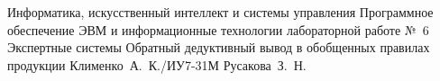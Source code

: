 \documentclass{bmstu}
\begin{document}
\makereporttitle
    {Информатика, искусственный интеллект и системы управления} %
    {Программное обеспечение ЭВМ и информационные технологии} %
    {лабораторной работе №~6} %
    {Экспертные системы} %
    {Обратный дедуктивный вывод в обобщенных правилах продукции} %
    {} %
    {Клименко~А.~К./ИУ7-31М} %
    {Русакова~З.~Н.} %





\end{document}
